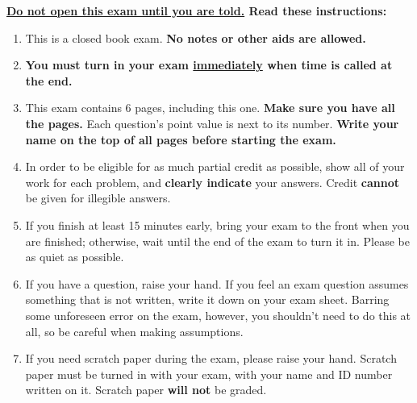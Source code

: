 \documentclass[11pt]{article}
\begin{document}

  \noindent
  {\large\textbf{\underline{Do not open this exam until you are told.}  Read
  these instructions:}}

  \vspace{-2mm}

  \thispagestyle{myheadings}

  \begin{enumerate}

    \addtolength{\itemsep}{-2mm}  %

    \item This is a closed book exam.  \textbf{No
          notes %
          or other aids are allowed.}

    \item {\bf You must turn in your exam \underline{immediately} when time is
          called at the end.}

    \item This exam contains %
          6 pages, including this one.  \textbf{Make sure you have all the
          pages.}  Each question's point value is next to its number.
          \textbf{Write your name on the top of all pages before starting
          the exam.}

    \item In order to be eligible for as much partial credit as possible,
          show all of your work for each problem, and \textbf{clearly
          indicate} your answers.  Credit \textbf{cannot} be given for
          illegible answers.

    \item If you finish at least 15 minutes early, bring your exam to the
          front when you are finished; otherwise, wait until the end of the
          exam to turn it in. Please be as quiet as possible.

    \item If you have a question, raise your hand.  If you feel an exam
          question assumes something that is not written, write it down on
          your exam sheet.  Barring some unforeseen error on the exam,
          however, you shouldn't need to do this at all, so be careful when
          making assumptions.

    \item If you need scratch paper during the exam, please raise your hand.
          Scratch paper must be turned in with your exam, with your name and
          ID number written on it.  Scratch paper \textbf{will not} be
          graded.


\end{enumerate}
\end{document}
